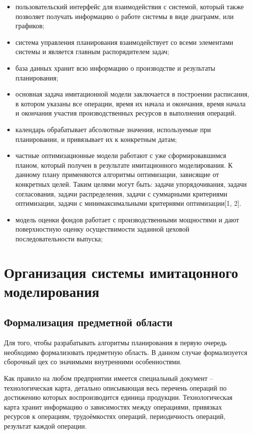 \begin{itemize}
    \item пользовательский интерфейс для взаимодействия с системой, который также позволяет получать информацию о работе системы в виде диаграмм, или графиков; 
    \item система управления планирования взаимодействует со всеми элементами системы и является главным распорядителем задач;
    \item база данных хранит всю информацию о производстве и результаты планирования; 
    \item основная задача имитационной модели заключается в построении расписания, в котором указаны все операции, время их начала и окончания, время начала и окончания участия производственных ресурсов в выполнения операций.
    \item календарь обрабатывает абсолютные значения, используемые при планировании, и привязывает их к конкретным датам;
    \item частные оптимизационные модели работают с уже сформировавшимся планом, который получен в результате имитационного моделирования. К данному плану применяются алгоритмы оптимизации, зависящие от конкретных целей. Таким целями могут быть: задачи упорядочивания, задачи согласования, задачи распределения, задачи с суммарными критериями оптимизации, задачи с минимаксимальными критериями оптимизации[1, 2].
    \item модель оценки фондов работает с производственными мощностями и дают поверхностную оценку осуществимости заданной цеховой последовательности выпуска;
\end{itemize}

\section{Организация системы имитацонного моделирования}

\subsection{Формализация предметной области}

Для того, чтобы разрабатывать алгоритмы планирования в первую очередь необходимо формализовать предметную область. В данном случае формализуется сборочный цех со значимыми внутренними особенностями.

Как правило на любом предприятии имеется специальный документ – технологическая карта, детально описывающая весь перечень операций по достижению которых воспроизводится единица продукции. Технологическая карта хранит информацию о зависимостях между операциями, привязках ресурсов к операциям, трудоёмкостях операций, периодичность операций, результат каждой операции. 

